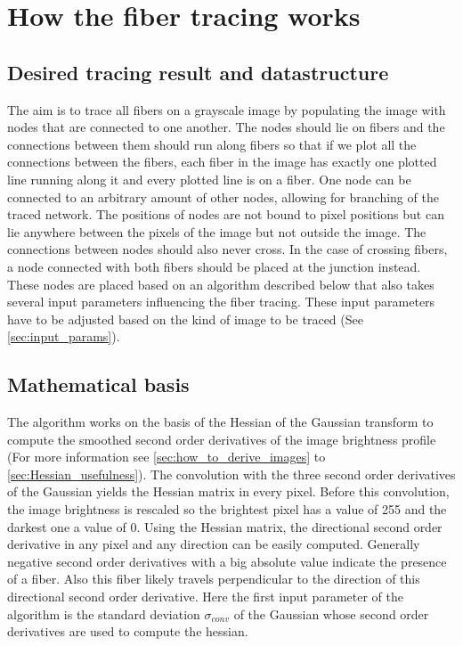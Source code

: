 \documentclass[12pt,english,twocolumn]{revtex4}
\begin{document}
\section{How the fiber tracing works}
\subsection{Desired tracing result and datastructure}
The aim is to trace all fibers on a grayscale image by populating the image with nodes that are connected to one another. The nodes should lie on fibers and the connections between them should run along fibers so that if we plot all the connections between the fibers, each fiber in the image has exactly one plotted line running along it and every plotted line is on a fiber. One node can be connected to an arbitrary amount of other nodes, allowing for branching of the traced network. The positions of nodes are not bound to pixel positions but can lie anywhere between the pixels of the image but not outside the image. The connections between nodes should also never cross. In the case of crossing fibers, a node connected with both fibers should be placed at the junction instead. These nodes are placed based on an algorithm described below that also takes several input parameters influencing the fiber tracing. These input parameters have to be adjusted based on the kind of image to be traced (See \ref{sec:input_params}).
\subsection{Mathematical basis} \label{sec:math_basis}
The algorithm works on the basis of the Hessian of the Gaussian transform to compute the smoothed second order derivatives of the image brightness profile (For more information see \ref{sec:how_to_derive_images} to \ref{sec:Hessian_usefulness}). The convolution with the three second order derivatives of the Gaussian yields the Hessian matrix in every pixel. Before this convolution, the image brightness is rescaled so the brightest pixel has a value of 255 and the darkest one a value of 0. Using the Hessian matrix, the directional second order derivative in any pixel and any direction can be easily computed. Generally negative second order derivatives with a big absolute value indicate the presence of a fiber. Also this fiber likely travels perpendicular to the direction of this directional second order derivative. Here the first input parameter of the algorithm is the standard deviation $\sigma_{conv}$ of the Gaussian whose second order derivatives are used to compute the hessian.
\end{document}
